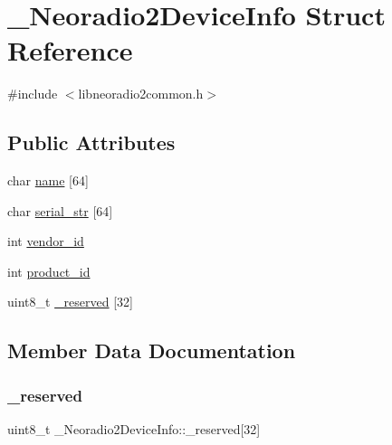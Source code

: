 \hypertarget{struct___neoradio2_device_info}{}\section{\+\_\+\+Neoradio2\+Device\+Info Struct Reference}
\label{struct___neoradio2_device_info}


{\ttfamily \#include $<$libneoradio2common.\+h$>$}

\subsection*{Public Attributes}
\begin{DoxyCompactItemize}
\item 
char \mbox{\hyperlink{struct___neoradio2_device_info_a189d95b3518783c7d6c623ea83c359d9}{name}} \mbox{[}64\mbox{]}
\item 
char \mbox{\hyperlink{struct___neoradio2_device_info_ac31c3f6863cf271c8def99f1bcf16612}{serial\+\_\+str}} \mbox{[}64\mbox{]}
\item 
int \mbox{\hyperlink{struct___neoradio2_device_info_a4a0d14a2c1fc09f40e7b3e9c6ade6afc}{vendor\+\_\+id}}
\item 
int \mbox{\hyperlink{struct___neoradio2_device_info_ac13767e0fa3cc6ae625c4f8d53736944}{product\+\_\+id}}
\item 
uint8\+\_\+t \mbox{\hyperlink{struct___neoradio2_device_info_ab0b64fd961968391dc2bc04a11dae312}{\+\_\+reserved}} \mbox{[}32\mbox{]}
\end{DoxyCompactItemize}


\subsection{Member Data Documentation}
\mbox{\label{struct___neoradio2_device_info_ab0b64fd961968391dc2bc04a11dae312}} 
\subsubsection{\texorpdfstring{\+\_\+reserved}{\_reserved}}
{\footnotesize\ttfamily uint8\+\_\+t \+\_\+\+Neoradio2\+Device\+Info\+::\+\_\+reserved\mbox{[}32\mbox{]}}

